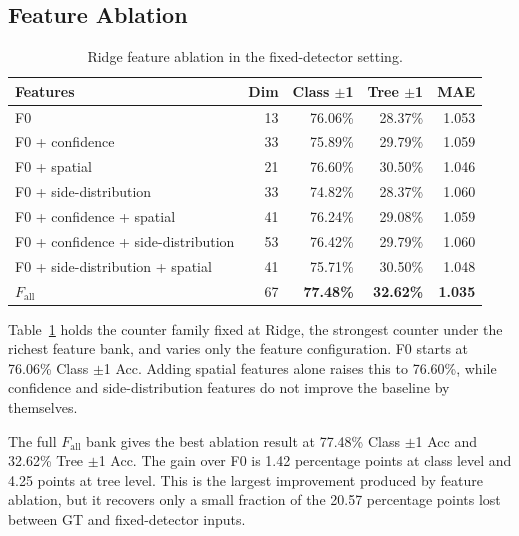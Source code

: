 \documentclass[conference]{IEEEtran}
\begin{document}
\subsection{Feature Ablation}
\label{sec:ablation}

\begin{table}[!htbp]
  \centering
  \scriptsize
  \setlength{\tabcolsep}{2.2pt}
  \caption{Ridge feature ablation in the fixed-detector setting.}
  \label{tab:ablation}
  \begin{tabular}{@{}>{\raggedright\arraybackslash}p{}rrrr@{}}
    \toprule
    Features                            & Dim & Class $\pm$1 & Tree $\pm$1 & MAE            \\
    \midrule
    F0                                  &  13 & 76.06\%          & 28.37\%          & 1.053          \\
    F0 + confidence                     &  33 & 75.89\%          & 29.79\%          & 1.059          \\
    F0 + spatial                        &  21 & 76.60\%          & 30.50\%          & 1.046          \\
    F0 + side-distribution              &  33 & 74.82\%          & 28.37\%          & 1.060          \\
    F0 + confidence + spatial           &  41 & 76.24\%          & 29.08\%          & 1.059          \\
    F0 + confidence + side-distribution &  53 & 76.42\%          & 29.79\%          & 1.060          \\
    F0 + side-distribution + spatial    &  41 & 75.71\%          & 30.50\%          & 1.048          \\
    $F_{\text{all}}$                    &  67 & \textbf{77.48\%} & \textbf{32.62\%} & \textbf{1.035} \\
    \bottomrule
  \end{tabular}
\end{table}

Table~\ref{tab:ablation} holds the counter family fixed at Ridge, the strongest
counter under the richest feature bank, and varies only the feature
configuration. F0 starts at 76.06\% Class $\pm$1 Acc. Adding spatial features
alone raises this to 76.60\%, while confidence and side-distribution features do
not improve the baseline by themselves.

The full $F_{\text{all}}$ bank gives the best ablation result at 77.48\% Class
$\pm$1 Acc and 32.62\% Tree $\pm$1 Acc. The gain over F0 is 1.42 percentage
points at class level and 4.25 points at tree level. This is the largest
improvement produced by feature ablation, but it recovers only a small fraction
of the 20.57 percentage points lost between GT and fixed-detector inputs.
\end{document}
